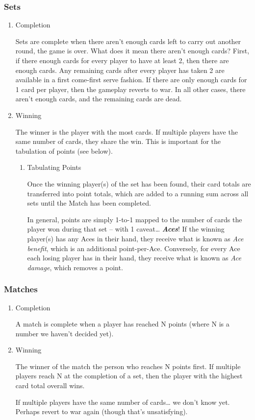 \documentclass[11pt]{article}
\begin{document}
\subsubsection{Sets}
\label{sec-2-2-3}

\begin{enumerate}
\item Completion
\label{sec-2-2-3-1}

Sets are complete when there aren't enough cards left to carry out
another round, the game is over. What does it mean there aren't enough
cards? First, if there enough cards for every player to have at least
2, then there are enough cards. Any remaining cards after every player
has taken 2 are available in a first come-first serve fashion. If
there are only enough cards for 1 card per player, then the gameplay
reverts to war. In all other cases, there aren't enough cards, and the
remaining cards are dead.

\item Winning
\label{sec-2-2-3-2}

The winner is the player with the most cards. If multiple players have
the same number of cards, they share the win. This is important for
the tabulation of points (see below).

\begin{enumerate}
\item Tabulating Points
\label{sec-2-2-3-2-1}

Once the winning player(s) of the set has been found, their card
totals are transferred into point totals, which are added to a running
sum across all sets until the Match has been completed. 

In general, points are simply 1-to-1 mapped to the number of cards the
player won during that set -- with 1 caveat\ldots{} \textbf{\emph{Aces}}! If the winning
player(s) has any Aces in their hand, they receive what is known as
\emph{Ace benefit}, which is an additional point-per-Ace. Conversely, for
every Ace each losing player has in their hand, they receive what is
known as \emph{Ace damage}, which removes a point.
\end{enumerate}
\end{enumerate}

\subsubsection{Matches}
\label{sec-2-2-4}
\begin{enumerate}
\item Completion
\label{sec-2-2-4-1}

A match is complete when a player has reached N points (where N is a
number we haven't decided yet).

\item Winning
\label{sec-2-2-4-2}

The winner of the match the person who reaches N points first. If
multiple players reach N at the completion of a set, then the player
with the highest card total overall wins. 

If multiple players have the same number of cards\ldots{} we don't know
yet. Perhaps revert to war again (though that's unsatisfying).
\end{enumerate}
\end{document}

